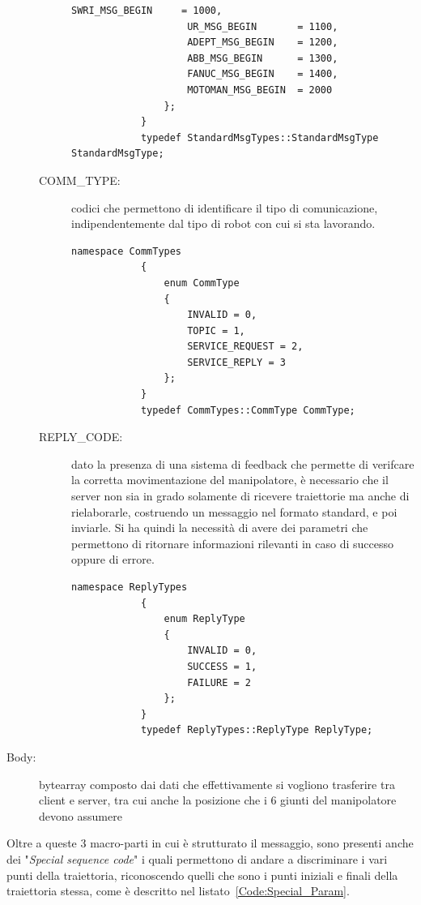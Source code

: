 \begin{description}
\begin{description}
\begin{lstlisting}[style=Matlab-editor,caption=Definizione dei parametri del campo MSG\_TYPE,captionpos=b,label={Code:MSGTYPE_Param}, basicstyle=\tiny\ttfamily,frame=trBL]
					SWRI_MSG_BEGIN     = 1000,
					UR_MSG_BEGIN       = 1100,
					ADEPT_MSG_BEGIN    = 1200,
					ABB_MSG_BEGIN      = 1300,
					FANUC_MSG_BEGIN    = 1400,
					MOTOMAN_MSG_BEGIN  = 2000
				};
			}
			typedef StandardMsgTypes::StandardMsgType StandardMsgType;
		\end{lstlisting}
		\item[COMM\_TYPE:] codici che permettono di identificare il tipo di comunicazione, indipendentemente dal tipo di robot con cui si sta lavorando. 
		\begin{lstlisting}[style=Matlab-editor,caption=Definizione dei parametri del campo COMM\_TYPE,captionpos=b,label={Code:COMMTYPE_Param}, basicstyle=\tiny\ttfamily,frame=trBL]
			namespace CommTypes
			{
				enum CommType
				{
					INVALID = 0,
					TOPIC = 1,
					SERVICE_REQUEST = 2,
					SERVICE_REPLY = 3
				};
			}
			typedef CommTypes::CommType CommType;
		\end{lstlisting}
		\item[REPLY\_CODE:] dato la presenza di una sistema di feedback che permette di verifcare la corretta movimentazione del manipolatore, è necessario che il server non sia in grado solamente di ricevere traiettorie ma anche di rielaborarle, costruendo un messaggio nel formato standard, e poi inviarle. Si ha quindi la necessità di avere dei parametri che permettono di ritornare informazioni rilevanti in caso di successo oppure di errore.
		\begin{lstlisting}[style=Matlab-editor,caption=Definizione dei parametri del campo REPLY\_CODE,captionpos=b,label={Code:REPLYTYPE_Param}, basicstyle=\tiny\ttfamily,frame=trBL]
			namespace ReplyTypes
			{
				enum ReplyType
				{
					INVALID = 0,
					SUCCESS = 1,
					FAILURE = 2
				};
			}
			typedef ReplyTypes::ReplyType ReplyType;
		\end{lstlisting}
	\end{description}
	\item[Body:] bytearray composto dai dati che effettivamente si vogliono trasferire tra client e server, tra cui anche la posizione che i 6 giunti del manipolatore devono assumere 
\end{description}
Oltre a queste 3 macro-parti in cui è strutturato il messaggio, sono presenti anche dei "\emph{Special sequence code}" i quali permettono di andare a discriminare i vari punti della traiettoria, riconoscendo quelli che sono i punti iniziali e finali della traiettoria stessa, come è descritto nel listato~\vref{Code:Special_Param}.
